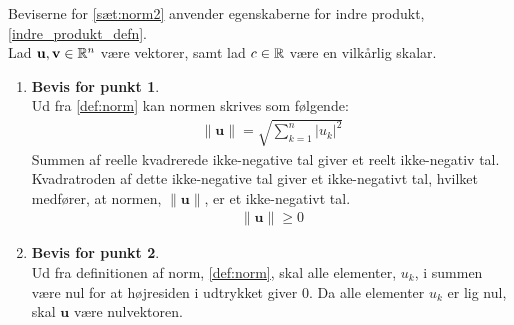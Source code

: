 \begin{bev} \textbf{} %
\newline
Beviserne for \autoref{sæt:norm2} anvender egenskaberne for indre produkt, \autoref{indre_produkt_defn}.\\
Lad $\mathbf{u}, \mathbf{v} \in \mathbb{R}^n$ være vektorer, samt lad $c\in \mathbb{R}$ være en vilkårlig skalar.

\begin{enumerate}
    \item[] \textbf{Bevis for punkt 1}.\\
        Ud fra \autoref{def:norm} kan normen skrives som følgende:
        \begin{align*}
            \|\mathbf{u}\| = \sqrt{\sum^n_{k=1}|u_k|^2}
        \end{align*}
        Summen af reelle kvadrerede ikke-negative tal giver et reelt ikke-negativ tal. Kvadratroden af dette ikke-negative tal giver et ikke-negativt tal, hvilket medfører, at normen, $\|\textbf{u}\|$, er et ikke-negativt tal.
        \begin{align*}
            \| \mathbf{u} \| \geq 0
        \end{align*}
    \item[] \textbf{Bevis for punkt 2}.\\ 
        Ud fra definitionen af norm, \autoref{def:norm}, skal alle elementer, $u_k$, i summen være nul for at højresiden i udtrykket giver 0. Da alle elementer $u_k$ er lig nul, skal $\textbf{u}$ være nulvektoren. 
        

\end{enumerate}
\end{bev}
